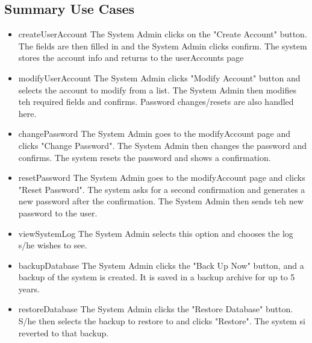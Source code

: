\documentclass{article}
\begin{document}
\subsection{Summary Use Cases}
\begin{itemize}
  \item createUserAccount
The System Admin clicks on the "Create Account" button. The fields are then filled in 
and the System Admin clicks confirm. The system stores the account info and returns to the userAccounts page
  \item modifyUserAccount
The System Admin clicks "Modify Account" button and selects the account to modify from a list. The System Admin 
then modifies teh required fields and confirms. Password changes/resets are also handled here.
  \item changePassword
The System Admin goes to the modifyAccount page and clicks "Change Password". The System Admin then changes 
the password and confirms. The system resets the password and shows a confirmation.
  \item resetPassword
The System Admin goes to the modifyAccount page and clicks "Reset Password". The system asks for a second confirmation 
and generates a new password after the confirmation. The System Admin then sends teh new password to the user.
  \item viewSystemLog
The System Admin selects this option and chooses the log s/he wishes to see.
  \item backupDatabase
The System Admin clicks the "Back Up Now" button, and a backup of the system is created. It is saved in a backup archive for up to 5 years.
  \item restoreDatabase
The System Admin clicks the "Restore Database" button. S/he then selects the backup to restore to and clicks "Restore". The system 
si reverted to that backup.


\end{itemize}
\end{document}

